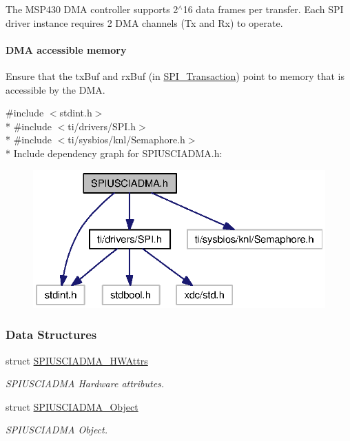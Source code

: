 The M\-S\-P430 D\-M\-A controller supports 2$^\wedge$16 data frames per transfer. Each S\-P\-I driver instance requires 2 D\-M\-A channels (Tx and Rx) to operate.

\paragraph*{D\-M\-A accessible memory}

Ensure that the tx\-Buf and rx\-Buf (in \hyperlink{struct_s_p_i___transaction}{S\-P\-I\-\_\-\-Transaction}) point to memory that is accessible by the D\-M\-A. 

{\ttfamily \#include $<$stdint.\-h$>$}\\*
{\ttfamily \#include $<$ti/drivers/\-S\-P\-I.\-h$>$}\\*
{\ttfamily \#include $<$ti/sysbios/knl/\-Semaphore.\-h$>$}\\*
Include dependency graph for S\-P\-I\-U\-S\-C\-I\-A\-D\-M\-A.\-h\-:
\nopagebreak
\begin{figure}[H]
\begin{center}
\leavevmode
\includegraphics[width=322pt]{_s_p_i_u_s_c_i_a_d_m_a_8h__incl}
\end{center}
\end{figure}
\subsubsection*{Data Structures}
\begin{DoxyCompactItemize}
\item 
struct \hyperlink{struct_s_p_i_u_s_c_i_a_d_m_a___h_w_attrs}{S\-P\-I\-U\-S\-C\-I\-A\-D\-M\-A\-\_\-\-H\-W\-Attrs}
\begin{DoxyCompactList}\small\item\em S\-P\-I\-U\-S\-C\-I\-A\-D\-M\-A Hardware attributes. \end{DoxyCompactList}\item 
struct \hyperlink{struct_s_p_i_u_s_c_i_a_d_m_a___object}{S\-P\-I\-U\-S\-C\-I\-A\-D\-M\-A\-\_\-\-Object}
\begin{DoxyCompactList}\small\item\em S\-P\-I\-U\-S\-C\-I\-A\-D\-M\-A Object. \end{DoxyCompactList}\end{DoxyCompactItemize}
